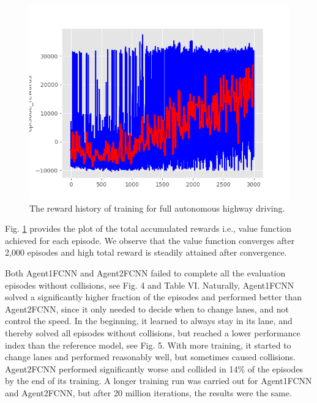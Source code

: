 \begin{figure}[h]
\centering
\includegraphics[width=1.0\textwidth]{figs/ch5/agent2-vehicle-reward-history-epoch-3000-std-track}
\caption{The reward history of training for full autonomous highway driving.}
\label{fig:res-2}
\end{figure}

Fig. \ref{fig:res-2} provides the plot of the total accumulated rewards i.e., value function achieved for each episode. We observe that the value function converges after 2,000 episodes and high total reward is steadily attained after convergence.

Both Agent1FCNN and Agent2FCNN failed to complete all the evaluation episodes without collisions, see Fig. 4 and Table VI. Naturally, Agent1FCNN solved a significantly higher fraction of the episodes and performed better than Agent2FCNN, since it only needed to decide when to change lanes, and not control the speed. In the beginning, it learned to always stay in its lane, and thereby solved all episodes without collisions, but reached a lower performance index than the reference model, see Fig. 5. With more training, it started to change lanes and performed reasonably well, but sometimes caused collisions. Agent2FCNN performed significantly worse and collided in 14\% of the episodes by the end of its training. A longer training run was carried out for Agent1FCNN and Agent2FCNN, but after 20 million iterations, the results were the same.

